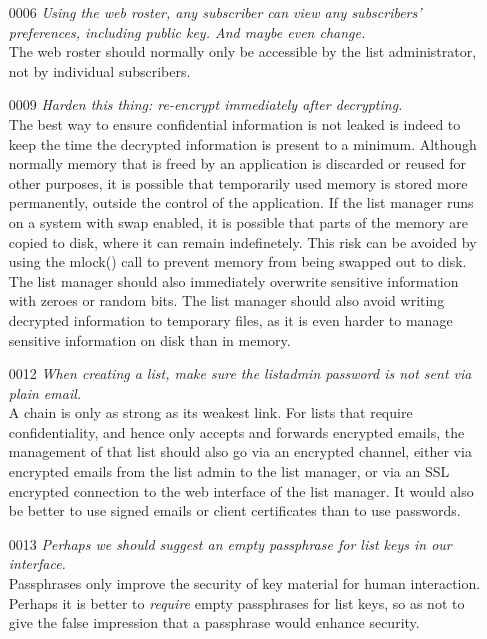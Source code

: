 \documentclass[a4]{article}
\begin{document}
\begin{enumerate}
\item[0006]\textit{Using the web roster, any subscriber can view any subscribers' preferences, including public key. And maybe even change.}
\\
The web roster should normally only be accessible by the list administrator, not by individual subscribers.

\item[0009]\textit{Harden this thing: re-encrypt immediately after decrypting.}
\\
The best way to ensure confidential information is not leaked is indeed to keep the time the decrypted information is present to a minimum.
Although normally memory that is freed by an application is discarded or reused for other purposes, it is possible that temporarily used memory is stored more permanently, outside the control of the application.
If the list manager runs on a system with swap enabled, it is possible that parts of the memory are copied to disk, where it can remain indefinetely.
This risk can be avoided by using the mlock() call to prevent memory from being swapped out to disk.
The list manager should also immediately overwrite sensitive information with zeroes or random bits.
The list manager should also avoid writing decrypted information to temporary files, as it is even harder to manage sensitive information on disk than in memory.

\item[0012]\textit{When creating a list, make sure the listadmin password is not sent via plain email.}
\\
A chain is only as strong as its weakest link.
For lists that require confidentiality, and hence only accepts and forwards encrypted emails,
the management of that list should also go via an encrypted channel,
either via encrypted emails from the list admin to the list manager,
or via an SSL encrypted connection to the web interface of the list manager.
It would also be better to use signed emails or client certificates than to use passwords.

\item[0013] \textit{Perhaps we should suggest an empty passphrase for list keys in our interface.}
\\
Passphrases only improve the security of key material for human interaction.
Perhaps it is better to {\em require} empty passphrases for list keys,
so as not to give the false impression that a passphrase would enhance security.


\end{enumerate}
\end{document}
